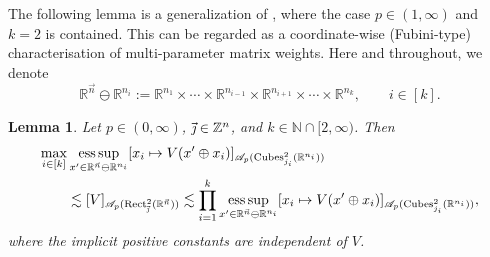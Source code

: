 \documentclass[11pt, reqno]{amsart}
\newtheorem{lemma}[theorem]{Lemma}
\theoremstyle{definition}
\theoremstyle{remark}
\numberwithin{equation}{section}
\newcommand{\A}{\mathscr A}
\newcommand{\R}{\mathbb R}
\newcommand{\vj}{\vec{\textit{\j}}}
\newcommand{\vn}{\vec n}
\newcommand{\esssup}{\operatornamewithlimits{ess\,sup}}
\newcommand{\Cubes}{\mathrm{Cubes}}
\newcommand{\Rect}{\mathrm{Rect}}
\begin{document}
The following lemma is a generalization of \cite[Lemmas 3.6 and 3.7]{DKPS}, where the case $p\in(1,\infty)$ and $k=2$ is contained.
This can be regarded as a coordinate-wise (Fubini-type)
characterisation of multi-parameter matrix weights. Here and throughout, we denote
\begin{equation*}
  \R^{\vn}\ominus\R^{n_i}
  :=\R^{n_1}\times\cdots\times\R^{n_{i-1}}\times
  \R^{n_{i+1}}\times\cdots\times\R^{n_{k}},\qquad i\in[k].
\end{equation*}

\begin{lemma}\label{prod vs coord}
Let $p\in(0,\infty)$, $\vj\in\mathbb Z^n$,
and $k\in\mathbb N\cap[2,\infty)$. Then
\begin{equation*}
\begin{split}
\max_{i\in[k]} &\esssup_{x'\in\R^{\vn}\ominus\R^{n_i}}  [x_i\mapsto V(x'\oplus x_i)]_{\A_{p}(\Cubes^2_{j_i}(\R^{n_i}))} \\
&\lesssim [V]_{\A_{p}(\Rect^2_{\vj}(\R^{\vn}))}
\lesssim\prod_{i=1}^k \esssup_{x'\in\R^{\vn}\ominus\R^{n_i}} [x_i\mapsto V(x'\oplus x_i)]_{\A_{p}(\Cubes^2_{j_i}(\R^{n_i}))},
\end{split}
\end{equation*}
where the implicit positive constants are independent of $V$.
\end{lemma}
\end{document}
